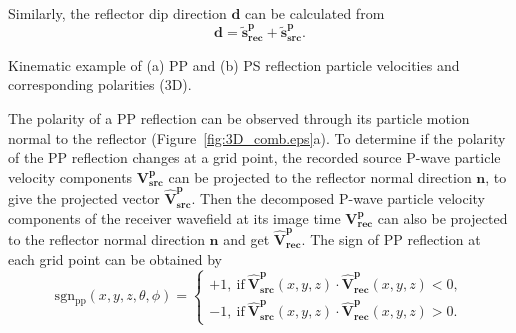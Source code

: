 \documentclass[manuscript,ulem,graphix,revised]{geophysics}
\begin{document}
Similarly, the reflector dip direction $\mathbf{d}$ can be calculated from
\begin{equation}
\mathbf{d}=\mathbf{\tilde{s}^p_{rec}}+\mathbf{\tilde{s}^{p}_{src}}.
\end{equation}
 

{
Kinematic example of (a) PP and (b) PS reflection particle velocities and corresponding polarities (3D). 
}

The polarity of a PP reflection can be observed through its particle motion normal to the reflector (Figure~\ref{fig:3D_comb.eps}a). To determine if the polarity of the PP reflection changes at a grid point, 
the recorded source P-wave particle velocity components $\mathbf{V}^{\mathbf{p}}_{\mathbf{src}}$ can be projected to the reflector normal direction $\mathbf{n}$, to give the projected vector $\hat{\mathbf{V}}^{\mathbf{p}}_{\mathbf{src}}$. Then 
the decomposed P-wave particle velocity components of the receiver wavefield at its image time $\mathbf{V}^{\mathbf{p}}_{\mathbf{rec}}$ can also be projected to the reflector normal direction $\mathbf{n}$ and get $\hat{\mathbf{V}}^{\mathbf{p}}_{\mathbf{rec}}$. The sign of PP reflection at each grid point can be obtained by
\begin{equation}
\mathrm{sgn_{pp}}(x,y,z,\theta, \phi)=\begin{cases}
 +1, \ \mathrm{if} \  \hat{\mathbf{V}}^{\mathbf{p}}_{\mathbf{src}}(x,y,z) \cdot \hat{\mathbf{V}}^{\mathbf{p}}_{\mathbf{rec}}(x,y,z)<0 , \\
 -1, \ \mathrm{if}  \ \hat{\mathbf{V}}^{\mathbf{p}}_{\mathbf{src}}(x,y,z) \cdot \hat{\mathbf{V}}^{\mathbf{p}}_{\mathbf{rec}}(x,y,z)>0 .
\end{cases}
\label{eqn:sgn_pp}
\end{equation}
\end{document}
